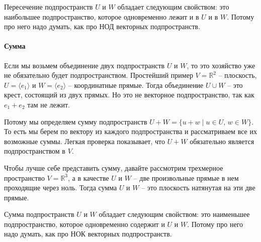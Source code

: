 Пересечение подпространств $U$ и $W$ обладает следующим свойством: это наибольшее подпространство, которое одновременно лежит и в $U$ и в $W$.
Потому про него надо думать, как про НОД векторных подпространств.

\paragraph{Сумма}

Если мы возьмем объединение двух подпространств $U$ и $W$, то это хозяйство уже не обязательно будет подпространством.
Простейший пример $V = \mathbb R^2$ -- плоскость, $U = \langle e_1\rangle$ и $W = \langle e_2 \rangle$ -- координатные прямые.
Тогда объединение $U\cup W$ -- это крест, состоящий из двух прямых.
Но это не векторное подпространство, так как $e_1 + e_2$ там не лежит.

Потому мы определяем сумму подпространств $U + W = \{u + w\mid u\in U,\, w\in W\}$.
То есть мы берем по вектору из каждого подпространства и рассматриваем все их возможные суммы.
Легкая проверка показывает, что $U+W$ обязательно является подпространством в $V$.

Чтобы лучше себе представить сумму, давайте рассмотрим трехмерное пространство $V = \mathbb R^3$, а в качестве $U$ и $W$ -- две произвольные прямые в нем проходящие через ноль.
Тогда сумма $U$ и $W$ -- это плоскость натянутая на эти две прямые.

Сумма подпространств $U$ и $W$ обладает следующим свойством: это наименьшее подпространство, которое одновременно содержит и $U$ и $W$.
Потому про него надо думать, как про НОК векторных подпространств.

